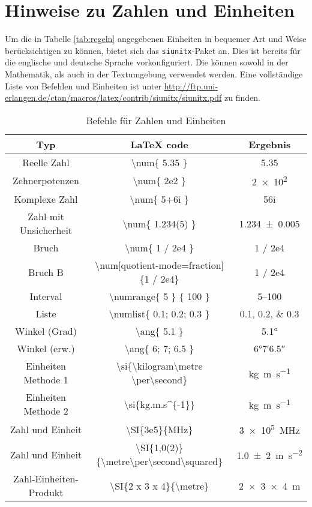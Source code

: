 \section{Hinweise zu Zahlen und Einheiten}

Um die in Tabelle \ref{tab:regeln} angegebenen Einheiten in bequemer Art und Weise berücksichtigen zu können, bietet sich das \texttt{siunitx}-Paket an. Dies ist bereits für die englische und deutsche Sprache vorkonfiguriert.
Die können sowohl in der Mathematik, als auch in der Textumgebung verwendet werden.
Eine vollständige Liste von Befehlen und Einheiten ist unter \url{http://ftp.uni-erlangen.de/ctan/macros/latex/contrib/siunitx/siunitx.pdf} zu finden.

\begin{table}[htbp]
  \caption{Befehle für Zahlen und Einheiten}
  \renewcommand{\arraystretch}{1.3}
  \centering
  \begin{tabular}{c c c }
    \toprule
    Typ & LaTeX code & Ergebnis \\
    \midrule
	Reelle Zahl & \textbackslash num\{ 5.35 \} & \num{5.35} \\
	Zehnerpotenzen & \textbackslash num\{ 2e2 \}  & \num{2e2} \\
	Komplexe Zahl & \textbackslash num\{ 5+6i \} & \num{ 5+6i} \\
	Zahl mit Unsicherheit & \textbackslash num\{ 1.234(5) \}  & \num{1.234(5)} \\
	Bruch & \textbackslash num\{ 1 / 2e4 \}  & \num{1 / 2e4} \\
	Bruch B & \textbackslash num[quotient-mode=fraction]\{1 / 2e4\} & \num[quotient-mode=fraction]{1 / 2e4} \\
	Interval & \textbackslash numrange\{ 5 \} \{ 100 \} & \numrange{5}{100} \\
	Liste & \textbackslash numlist\{ 0.1; 0.2; 0.3 \}  & \numlist{0.1; 0.2; 0.3} \\
	Winkel (Grad) & \textbackslash ang\{ 5.1 \} & \ang{5.1} \\
	Winkel (erw.) & \textbackslash ang\{ 6; 7; 6.5 \} & \ang{6;7;6.5} \\
	Einheiten Methode 1 & \textbackslash si\{\textbackslash kilogram\textbackslash metre \textbackslash per\textbackslash second\} & \si{\kilogram\metre\per\second} \\
	Einheiten Methode 2 & \textbackslash si\{kg.m.s\textasciicircum \{-1\}\} & \si{kg.m.s^{-1}} \\
	Zahl und Einheit & \textbackslash SI\{3e5\}\{MHz\} & \SI{3e5}{MHz} \\
	Zahl und Einheit & \textbackslash SI\{1,0(2)\}\{\textbackslash metre\textbackslash per\textbackslash second\textbackslash squared\} & \SI{1,0(2)}{\metre\per\second\squared} \\
	Zahl-Einheiten-Produkt & \textbackslash SI\{2 x 3 x 4\}\{\textbackslash metre\} & \SI{2 x 3 x 4}{\metre} \\
	\bottomrule
    \end{tabular}
  \label{tab:siunitx-table}
\end{table}


